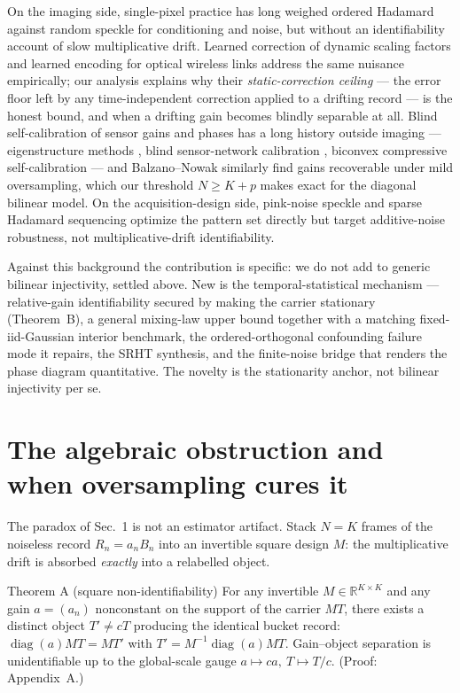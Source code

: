 On the imaging side, single-pixel practice has long weighed ordered Hadamard against random speckle for conditioning and noise, but without an identifiability account of slow multiplicative drift. Learned correction of dynamic scaling factors \cite{PengChen2024APL} and learned encoding for optical wireless links \cite{PengXiaoChen2025OE} address the same nuisance empirically; our analysis explains why their \emph{static-correction ceiling} --- the error floor left by any time-independent correction applied to a drifting record --- is the honest bound, and when a drifting gain becomes blindly separable at all. Blind self-calibration of sensor gains and phases has a long history outside imaging --- eigenstructure methods \cite{WeissFriedlander1990}, blind sensor-network calibration \cite{Balzano2007IPSN}, biconvex compressive self-calibration \cite{LingStrohmer2015} --- and Balzano--Nowak similarly find gains recoverable under mild oversampling, which our threshold $N\ge K+p$ makes exact for the diagonal bilinear model. On the acquisition-design side, pink-noise speckle \cite{Nie2021PRA} and sparse Hadamard sequencing \cite{Han2025OE} optimize the pattern set directly but target additive-noise robustness, not multiplicative-drift identifiability.

Against this background the contribution is specific: we do not add to generic bilinear injectivity, settled above. New is the temporal-statistical mechanism --- relative-gain identifiability secured by making the carrier stationary (Theorem~B), a general mixing-law upper bound together with a matching fixed-iid-Gaussian interior benchmark, the ordered-orthogonal confounding failure mode it repairs, the SRHT synthesis, and the finite-noise bridge that renders the phase diagram quantitative. The novelty is the stationarity anchor, not bilinear injectivity per se.

\section{The algebraic obstruction and when oversampling cures it}

The paradox of Sec.~1 is not an estimator artifact. Stack $N=K$ frames of the noiseless record $R_n = a_n B_n$ into an invertible square design $M$: the multiplicative drift is absorbed \emph{exactly} into a relabelled object.

\begin{namedthm}{Theorem A (square non-identifiability)}
For any invertible $M\in\mathbb R^{K\times K}$ and any gain $a=(a_n)$ nonconstant on the support of the carrier $MT$, there exists a distinct object $T'\neq cT$ producing the identical bucket record: $\operatorname{diag}(a)MT = M T'$ with $T'=M^{-1}\operatorname{diag}(a)MT$. Gain--object separation is unidentifiable up to the global-scale gauge $a\mapsto ca,\ T\mapsto T/c$. (Proof: Appendix~A.)
\end{namedthm}

